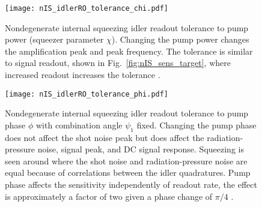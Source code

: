 \begin{figure}
	\centering
	\texttt{[image: nIS\_idlerRO\_tolerance\_chi.pdf]}
	\caption{  Nondegenerate internal squeezing idler readout tolerance to pump power (squeezer parameter $\chi$). Changing the pump power changes the amplification peak and peak frequency. The tolerance is similar to signal readout, shown in Fig.~\ref{fig:nIS_sens_target}, where increased readout increases the tolerance .}
	\label{fig:nIS_idlerRO_tolerance_chi}
\end{figure}
\begin{figure}
    \centering
    \texttt{[image: nIS\_idlerRO\_tolerance\_phi.pdf]}
    \caption{  Nondegenerate internal squeezing idler readout tolerance to pump phase $\phi$ with combination angle $\psi_1$ fixed. Changing the pump phase does not affect the shot noise peak but does affect the radiation-pressure noise, signal peak, and DC signal response. Squeezing is seen around where the shot noise and radiation-pressure noise are equal  because of correlations between the idler quadratures. Pump phase affects the sensitivity independently of readout rate, the effect is approximately a factor of two given a phase change of $\pi/4$ .}
    \label{fig:nIS_idlerRO_tolerance_phi}
\end{figure}


